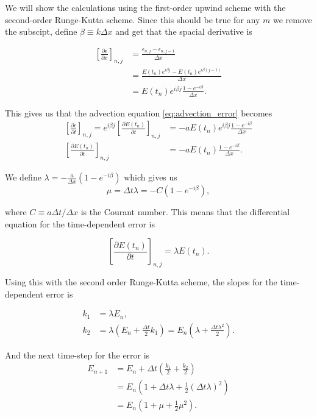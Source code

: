\documentclass{article}
\begin{document}
We will show the calculations using the first-order upwind scheme with the second-order Runge-Kutta scheme. Since this should be true for any $m$ we remove the subscipt, define $\beta\equiv k\Delta x$ and get that the spacial derivative is

\begin{align*}
    \left[\frac{\partial \epsilon}{\partial x}\right]_{n,j} &= \frac{\epsilon_{n,j}-\epsilon_{n,j-1}}{\Delta x}\\
    &= \frac{E(t_n) e^{i \beta j}- E(t_n) e^{i \beta (j-1)}}{\Delta x}\\
    &= E(t_n)e^{i\beta j} \frac{1-e^{-i\beta}}{\Delta x}.
\end{align*}

This gives us that the advection equation \ref{eq:advection_error} becomes
\begin{align}
    \left[\frac{\partial \epsilon}{\partial t}\right]_{n,j} = e^{i\beta j}\left[\frac{\partial E(t_n)}{\partial t}\right]_{n,j} &= -a E(t_n)e^{i\beta j} \frac{1-e^{-i\beta}}{\Delta x}\\
    \left[\frac{\partial E(t_n)}{\partial t}\right]_{n,j} &= -a E(t_n)\frac{1-e^{-i\beta}}{\Delta x}.
\end{align}

We define $\lambda= - \frac{a}{\Delta x}\left( 1-e^{-i\beta} \right)$ which gives us 
\begin{equation}
    \mu = \Delta t \lambda = - C\left( 1-e^{-i\beta} \right),
\end{equation}

where $C\equiv a\Delta t/\Delta x$ is the Courant number. This means that the differential equation for the time-dependent error is

\begin{equation}
    \left[\frac{\partial E(t_n)}{\partial t}\right]_{n,j} = \lambda E(t_n).
\end{equation}

Using this with the second order Runge-Kutta scheme, the slopes for the time-dependent error is

\begin{align*}
    k_1 &= \lambda E_n,\\
    k_2 &= \lambda \left(E_n+\frac{\Delta t}{2}k_1 \right) = E_n \left( \lambda + \frac{\Delta t \lambda^2}{2} \right).
\end{align*}

And the next time-step for the error is
\begin{align*}
    E_{n+1} &= E_n + \Delta t \left( \frac{k_1}{2} +\frac{k_2}{2} \right)\\
    &= E_n \left( 1 +\Delta t \lambda + \frac{1}{2}\left( \Delta t\lambda \right)^2 \right)\\
    & = E_n \left( 1 + \mu + \frac{1}{2}\mu^2  \right).
\end{align*}
\end{document}
